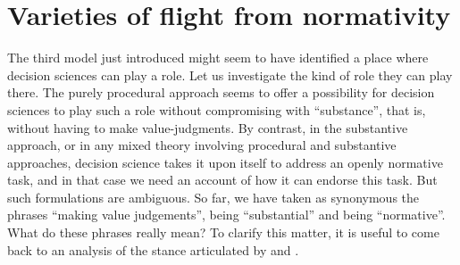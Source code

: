 \documentclass[preprint,11pt]{elsarticle}
\begin{document}
\section{Varieties of flight from normativity}
\noindent The third model just introduced might seem to have identified a place where decision sciences can play a role. Let us investigate the kind of role they can play there. The purely procedural approach seems to offer a possibility for decision sciences to play such a role without compromising with ``substance'', that is, without having to make value-judgments. By contrast, in the substantive approach, or in any mixed theory involving procedural and substantive approaches, decision science takes it upon itself to address an openly normative task, and in that case we need an account of how it can endorse this task.
But such formulations are ambiguous. So far, we have taken as synonymous the phrases ``making value judgements'', being ``substantial'' and being ``normative''. What do these phrases really mean? To clarify this matter, it is useful to come back to an analysis of the stance articulated by \cite{rawls_political_2005} and \cite{habermas_moralbewustsein_1983}.
\end{document}

